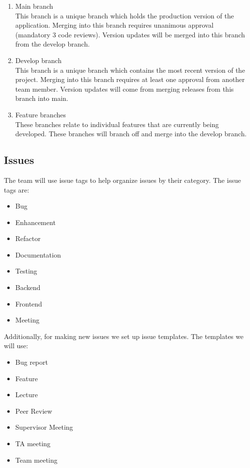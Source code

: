 \documentclass{article}
\begin{document}
\begin{enumerate}
  \item Main branch
  \\
  This branch is a unique branch which holds the production version of the application.
  Merging into this branch requires unanimous approval (mandatory 3 code reviews).
  Version updates will be merged into this branch from the develop branch. 
  \item Develop branch
  \\ This branch is a unique branch which contains the most recent version of the project. 
  Merging into this branch requires at least one approval from another team member. 
  Version updates will come from merging releases from this branch into main.  
  \item Feature branches
  \\
  These branches relate to individual features that are currently being developed. These branches will branch off and merge into the develop branch. 
\end{enumerate}

\subsection{Issues}
The team will use issue tags to help organize issues by their category. The issue tags are:
\begin{itemize}
  \item Bug
  \item Enhancement
  \item Refactor
  \item Documentation
  \item Testing
  \item Backend
  \item Frontend
  \item Meeting
\end{itemize}

Additionally, for making new issues we set up issue templates. The templates we will use:
\begin{itemize}
  \item Bug report
  \item Feature
  \item Lecture
  \item Peer Review 
  \item Supervisor Meeting
  \item TA meeting
  \item Team meeting
\end{itemize}
\end{document}
